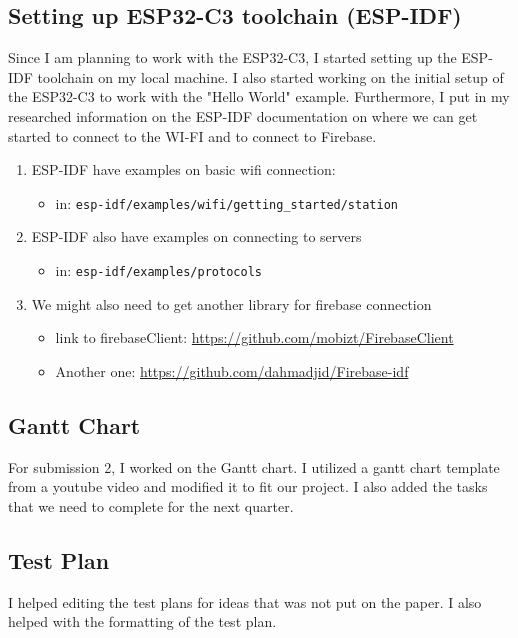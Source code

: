 \subsection{Setting up ESP32-C3 toolchain (ESP-IDF)}
Since I am planning to work with the ESP32-C3, I started setting up the ESP-IDF toolchain on my local machine. I also started working on the initial setup of the ESP32-C3 to work with the "Hello World" example. Furthermore, I put in my researched information on the ESP-IDF documentation on where we can get started to connect to the WI-FI and to connect to Firebase.

\begin{enumerate}
    \item ESP-IDF have examples on basic wifi connection:
    \begin{itemize}
        \item in: \texttt{esp-idf/examples/wifi/getting\_started/station}
    \end{itemize}
    \item ESP-IDF also have examples on connecting to servers
    \begin{itemize}
        \item in: \texttt{esp-idf/examples/protocols}
    \end{itemize}
    \item We might also need to get another library for firebase connection
    \begin{itemize}
        \item link to firebaseClient: \url{https://github.com/mobizt/FirebaseClient}
        \item Another one: \url{https://github.com/dahmadjid/Firebase-idf}
    \end{itemize}
\end{enumerate}

\subsection{Gantt Chart}
For submission 2, I worked on the Gantt chart. I utilized a gantt chart template from a youtube video and modified it to fit our project. I also added the tasks that we need to complete for the next quarter.

\subsection{Test Plan}
I helped editing the test plans for ideas that was not put on the paper. I also helped with the formatting of the test plan.
